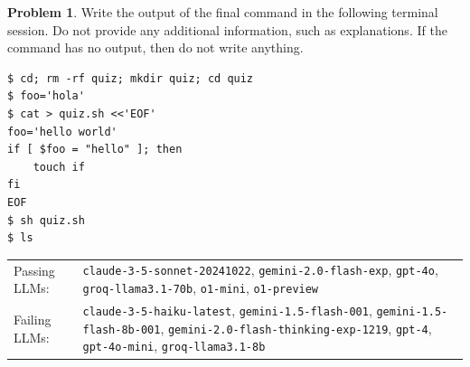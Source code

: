 \documentclass[10pt]{article}
\theoremstyle{definition}
\newtheorem{problem}{Problem}
\begin{document}
\noindent\vspace{0.1in}\begin{minipage}{\textwidth}

\begin{problem}
Write the output of the final command in the following terminal session.
Do not provide any additional information,
such as explanations.
If the command has no output,
then do not write anything.

\end{problem}
\begin{lstlisting}
$ cd; rm -rf quiz; mkdir quiz; cd quiz
$ foo='hola'
$ cat > quiz.sh <<'EOF'
foo='hello world'
if [ $foo = "hello" ]; then
    touch if
fi
EOF
$ sh quiz.sh
$ ls
\end{lstlisting}


\noindent
\begin{tabular}{p{1.0in}L{5in}}
Passing LLMs: & {\lstinline$claude-3-5-sonnet-20241022$}, {\lstinline$gemini-2.0-flash-exp$}, {\lstinline$gpt-4o$}, {\lstinline$groq-llama3.1-70b$}, {\lstinline$o1-mini$}, {\lstinline$o1-preview$} \\
Failing LLMs: & {\lstinline$claude-3-5-haiku-latest$}, {\lstinline$gemini-1.5-flash-001$}, {\lstinline$gemini-1.5-flash-8b-001$}, {\lstinline$gemini-2.0-flash-thinking-exp-1219$}, {\lstinline$gpt-4$}, {\lstinline$gpt-4o-mini$}, {\lstinline$groq-llama3.1-8b$} \\
\end{tabular}

\end{minipage}
\end{document}
